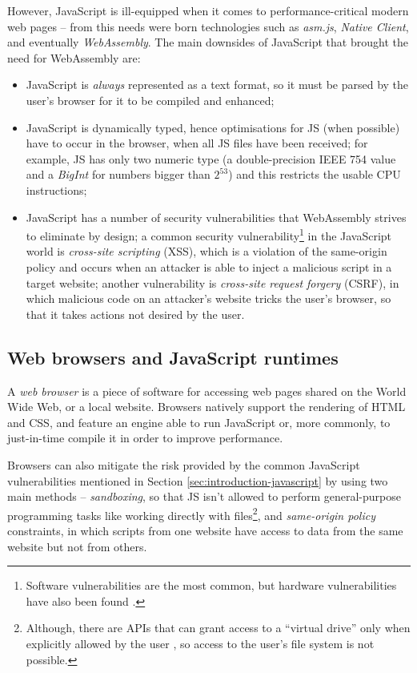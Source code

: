 However, JavaScript is ill-equipped when it comes to performance-critical modern web
pages -- from this needs were born technologies such as \textit{asm.js}, \textit{Native Client}, and eventually \textit{WebAssembly}.
The main downsides of JavaScript that brought the need for WebAssembly are:
\begin{itemize}
  \item JavaScript is \textit{always} represented as a text format, so it must be parsed by the user's browser for it to be compiled and enhanced;
  \item JavaScript is dynamically typed, hence optimisations for JS (when possible) have to occur
        in the browser, when all JS files have been received;
        for example, JS has only two numeric type (a double-precision IEEE 754 value and a \textit{BigInt}
        for numbers bigger than $2^{53}$) and this restricts the usable CPU instructions;
  \item JavaScript has a number of security vulnerabilities that WebAssembly strives to eliminate by design;
        a common security vulnerability\footnote{Software vulnerabilities are the most common, but hardware vulnerabilities have also been found \cite{spectre}.}
        in the JavaScript world is \textit{cross-site scripting} (XSS), which is a violation of the
        same-origin policy and occurs when an attacker is able to inject a malicious script in a target website;
        another vulnerability is \textit{cross-site request forgery} (CSRF), in which malicious code on an attacker's website
        tricks the user's browser, so that it takes actions not desired by the user.
\end{itemize}

\subsection{Web browsers and JavaScript runtimes}

A \textit{web browser} is a piece of software for accessing web pages shared on the World Wide Web, or a
local website. Browsers natively support the rendering of HTML and CSS, and feature an engine able to run JavaScript or, more commonly,
to just-in-time compile it in order to improve performance.

Browsers can also mitigate the risk provided by the common JavaScript vulnerabilities mentioned in Section \ref{sec:introduction-javascript}
by using two main methods -- \textit{sandboxing}, so that JS isn't allowed to perform general-purpose
programming tasks like working directly with files\footnote{Although, there are APIs that can grant access to a ``virtual drive''
only when explicitly allowed by the user \cite{filesystem-mdn}, so access to the user's file system is not possible.},
and \textit{same-origin policy} constraints, in which scripts from one website have access to data from the same website but not from others.

